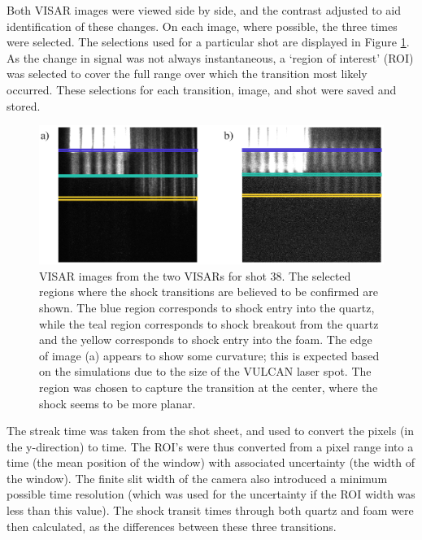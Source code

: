 Both VISAR images were viewed side by side, and the contrast adjusted to aid identification of these changes. On each image, where possible, the three times were selected. The selections used for a particular shot are displayed in Figure \ref{fig:VISAR ROI}. As the change in signal was not always instantaneous, a `region of interest' (ROI) was selected to cover the full range over which the transition most likely occurred. These selections for each transition, image, and shot were saved and stored.

\begin{figure} [h]
\begin{centering}
\includegraphics[width=1.0\textwidth]{figures/Experiment/VISARROI.eps}%
\caption{\label{fig:VISAR ROI} VISAR images from the two VISARs for shot 38. The selected regions where the shock transitions are believed to be confirmed are shown. The blue region corresponds to shock entry into the quartz, while the teal region corresponds to shock breakout from the quartz and the yellow corresponds to shock entry into the foam. The edge of image (a) appears to show some curvature; this is expected based on the simulations due to the size of the VULCAN laser spot. The region was chosen to capture the transition at the center, where the shock seems to be more planar.}
\end{centering}
\end{figure}

The streak time was taken from the shot sheet, and used to convert the pixels (in the y-direction) to time. The ROI's were thus converted from a pixel range into a time (the mean position of the window) with associated uncertainty (the width of the window). The finite slit width of the camera also introduced a minimum possible time resolution (which was used for the uncertainty if the ROI width was less than this value). The shock transit times through both quartz and foam were then calculated, as the differences between these three transitions.

